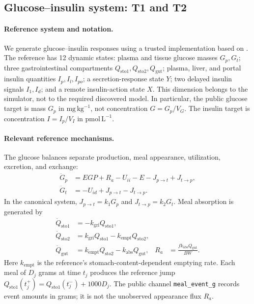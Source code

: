 \subsection{Glucose--insulin system: T1 and T2}
\label{app:benchmark_glucose}

\paragraph{Reference system and notation.}
We generate glucose--insulin responses using a trusted implementation based on
\citet{dalla2007meal}. The reference has 12 dynamic states: plasma and tissue
glucose masses $G_p,G_t$; three gastrointestinal compartments
$Q_{\mathrm{sto1}},Q_{\mathrm{sto2}},Q_{\mathrm{gut}}$; plasma, liver, and portal
insulin quantities $I_p,I_l,I_{po}$; a secretion-response state $Y$;
two delayed insulin signals $I_1,I_d$; and a remote insulin-action state $X$.
This dimension belongs to the simulator, not to the required discovered model.
In particular, the public glucose target is mass $G_p$ in
$\mathrm{mg}\,\mathrm{kg}^{-1}$, not concentration $G=G_p/V_G$.
The insulin target is concentration $I=I_p/V_I$ in
$\mathrm{pmol}\,\mathrm{L}^{-1}$.

\paragraph{Relevant reference mechanisms.}
The glucose balances separate production, meal appearance, utilization,
excretion, and exchange:
\begin{align}
\dot G_p &= EGP + R_a - U_{ii} - E - J_{p\to t}+J_{t\to p}, \\
\dot G_t &= -U_{id}+J_{p\to t}-J_{t\to p}.
\label{eq:app_glucose_balance}
\end{align}
In the canonical system, $J_{p\to t}=k_1G_p$ and $J_{t\to p}=k_2G_t$.
Meal absorption is generated by
\begin{align}
\dot Q_{\mathrm{sto1}} &= -k_{\mathrm{gri}}Q_{\mathrm{sto1}}, \\
\dot Q_{\mathrm{sto2}} &= k_{\mathrm{gri}}Q_{\mathrm{sto1}}
-k_{\mathrm{empt}}Q_{\mathrm{sto2}}, \\
\dot Q_{\mathrm{gut}} &= k_{\mathrm{empt}}Q_{\mathrm{sto2}}
-k_{\mathrm{abs}}Q_{\mathrm{gut}},
& R_a &= \frac{f k_{\mathrm{abs}}Q_{\mathrm{gut}}}{BW}.
\end{align}
Here $k_{\mathrm{empt}}$ is the reference's stomach-content-dependent emptying
rate. Each meal of $D_j$ grams at time $t_j$ produces the reference jump
$Q_{\mathrm{sto1}}(t_j^+)=Q_{\mathrm{sto1}}(t_j^-)+1000D_j$.
The public channel \texttt{meal\_event\_g} records event amounts in grams;
it is not the unobserved appearance flux $R_a$.

